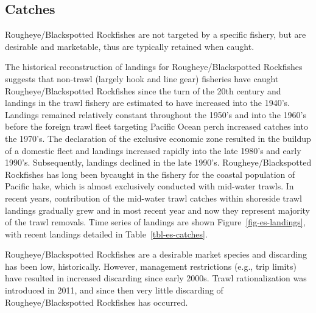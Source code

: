 \documentclass[
]{scrartcl}
\begin{document}
\subsection{Catches}\label{catches}

Rougheye/Blackspotted Rockfishes are not targeted by a specific fishery,
but are desirable and marketable, thus are typically retained when
caught.

The historical reconstruction of landings for Rougheye/Blackspotted
Rockfishes suggests that non-trawl (largely hook and line gear)
fisheries have caught Rougheye/Blackspotted Rockfishes since the turn of
the 20th century and landings in the trawl fishery are estimated to have
increased into the 1940's. Landings remained relatively constant
throughout the 1950's and into the 1960's before the foreign trawl fleet
targeting Pacific Ocean perch increased catches into the 1970's. The
declaration of the exclusive economic zone resulted in the buildup of a
domestic fleet and landings increased rapidly into the late 1980's and
early 1990's. Subsequently, landings declined in the late 1990's.
Rougheye/Blackspotted Rockfishes has long been bycaught in the fishery
for the coastal population of Pacific hake, which is almost exclusively
conducted with mid-water trawls. In recent years, contribution of the
mid-water trawl catches within shoreside trawl landings gradually grew
and in most recent year and now they represent majority of the trawl
removals. Time series of landings are shown
Figure~\ref{fig-es-landings}, with recent landings detailed in
Table~\ref{tbl-es-catches}.

Rougheye/Blackspotted Rockfishes are a desirable market species and
discarding has been low, historically. However, management restrictions
(e.g., trip limits) have resulted in increased discarding since early
2000s. Trawl rationalization was introduced in 2011, and since then very
little discarding of Rougheye/Blackspotted Rockfishes has occurred.

\begingroup
\fontsize{7.5pt}{9.0pt}\selectfont
\end{document}
